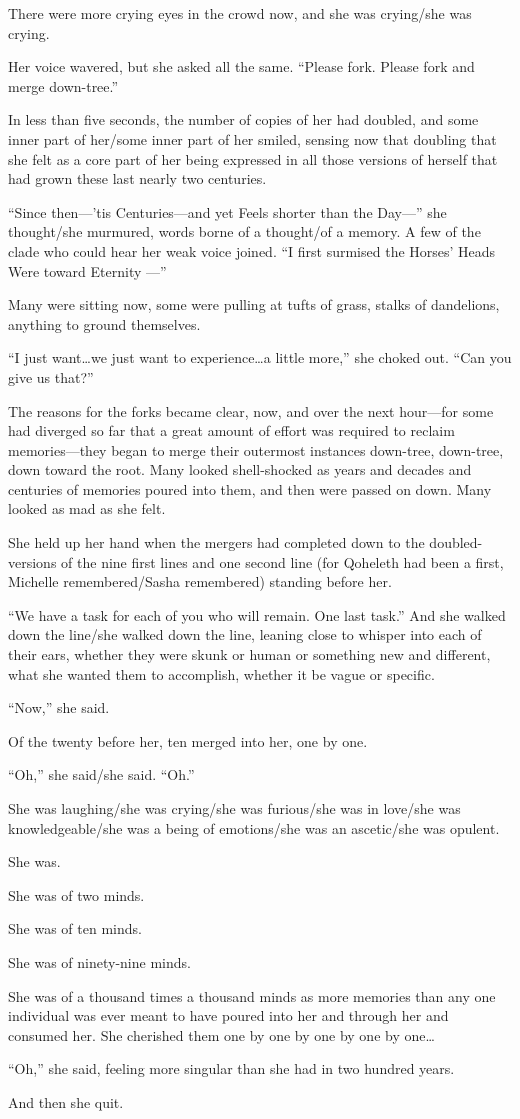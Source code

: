 There were more crying eyes in the crowd now, and she was crying/she was crying.

Her voice wavered, but she asked all the same. ``Please fork. Please fork and merge down-tree.''

In less than five seconds, the number of copies of her had doubled, and some inner part of her/some inner part of her smiled, sensing now that doubling that she felt as a core part of her being expressed in all those versions of herself that had grown these last nearly two centuries.

``Since then---'tis Centuries---and yet Feels shorter than the Day---'' she thought/she murmured, words borne of a thought/of a memory. A few of the clade who could hear her weak voice joined. ``I first surmised the Horses' Heads Were toward Eternity —''

Many were sitting now, some were pulling at tufts of grass, stalks of dandelions, anything to ground themselves.

``I just want\ldots we just want to experience\ldots a little more,'' she choked out. ``Can you give us that?''

The reasons for the forks became clear, now, and over the next hour---for some had diverged so far that a great amount of effort was required to reclaim memories---they began to merge their outermost instances down-tree, down-tree, down toward the root. Many looked shell-shocked as years and decades and centuries of memories poured into them, and then were passed on down. Many looked as mad as she felt.

She held up her hand when the mergers had completed down to the doubled-versions of the nine first lines and one second line (for Qoheleth had been a first, Michelle remembered/Sasha remembered) standing before her.

``We have a task for each of you who will remain. One last task.'' And she walked down the line/she walked down the line, leaning close to whisper into each of their ears, whether they were skunk or human or something new and different, what she wanted them to accomplish, whether it be vague or specific.

``Now,'' she said.

Of the twenty before her, ten merged into her, one by one.

``Oh,'' she said/she said. ``Oh.''

She was laughing/she was crying/she was furious/she was in love/she was knowledgeable/she was a being of emotions/she was an ascetic/she was opulent.

She was.

She was of two minds.

She was of ten minds.

She was of ninety-nine minds.

She was of a thousand times a thousand minds as more memories than any one individual was ever meant to have poured into her and through her and consumed her. She cherished them one by one by one by one by one\ldots{}

``Oh,'' she said, feeling more singular than she had in two hundred years.

And then she quit.
